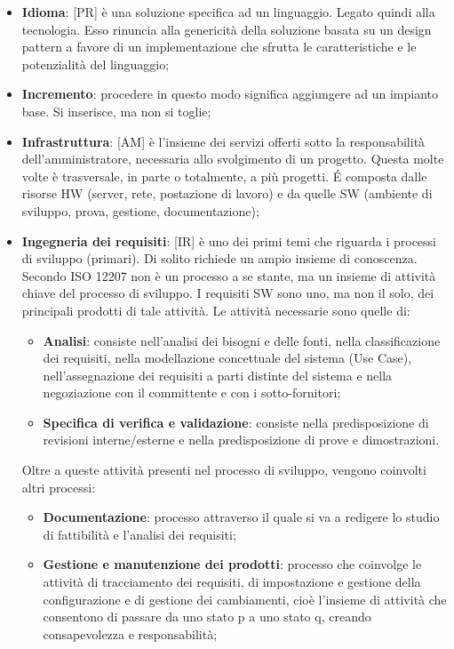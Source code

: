 \begin{itemize}
	\item \textbf{Idioma}: [PR] è una soluzione specifica ad un linguaggio. Legato quindi alla tecnologia. Esso rinuncia alla genericità della soluzione basata su un design pattern a favore di un implementazione che sfrutta le caratteristiche e le potenzialità del linguaggio;

	\item \textbf{Incremento}: procedere in questo modo significa aggiungere ad un impianto base. Si inserisce, ma non si toglie;


	\item \textbf{Infrastruttura}: [AM] è l'insieme dei servizi offerti sotto la responsabilità dell'amministratore, necessaria allo svolgimento di un progetto. Questa molte volte è trasversale, in parte o totalmente, a più progetti. \'E composta dalle risorse HW (server, rete, postazione di lavoro) e da quelle SW (ambiente di sviluppo, prova, gestione, documentazione);


	\item \textbf{Ingegneria dei requisiti}: [IR] è uno dei primi temi che riguarda i processi di sviluppo (primari). Di solito richiede un ampio insieme di conoscenza. Secondo ISO 12207 non è un processo a se stante, ma un insieme di attività chiave del processo di sviluppo. I requisiti SW sono uno, ma non il solo, dei principali prodotti di tale attività. Le attività necessarie sono quelle di:
		\begin{itemize}
			\item \textbf{Analisi}: consiste nell'analisi dei bisogni e delle fonti, nella classificazione dei requisiti, nella modellazione concettuale del sistema (Use Case), nell'assegnazione dei requisiti a parti distinte del sistema e nella negoziazione con il committente e con i sotto-fornitori;
			\item \textbf{Specifica di verifica e validazione}: consiste nella predisposizione di revisioni interne/esterne e nella predisposizione di prove e dimostrazioni.
		\end{itemize}
	\noindent
	Oltre a queste attività presenti nel processo di sviluppo, vengono coinvolti altri processi:
		\begin{itemize}
			\item \textbf{Documentazione}: processo attraverso il quale si va a redigere lo studio di fattibilità e l'analisi dei requisiti;
			\item \textbf{Gestione e manutenzione dei prodotti}: processo che coinvolge le attività di tracciamento dei requisiti, di impostazione e gestione della configurazione e di gestione dei cambiamenti, cioè l'insieme di attività che consentono di passare da uno stato p a uno stato q, creando consapevolezza e responsabilità;
		\end{itemize}


\end{itemize}
